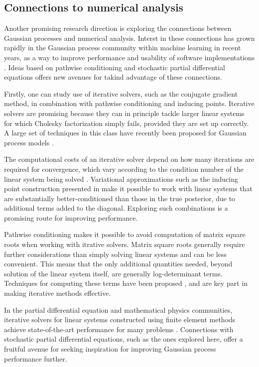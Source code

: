 \documentclass[11pt]{book}
\begin{document}
\subsection*{Connections to numerical analysis}

Another promising research direction is exploring the connections between Gaussian processes and numerical analysis.
Interst in these connections has grown rapidly in the Gaussian process community within machine learning in recent years, as a way to improve performance and usability of software implementations \cite{matthews17,gardner18,vanderwilk20}. 
Ideas based on pathwise conditioning and stochastic partial differential equations offers new avenues for takind advantage of these connections.

Firstly, one can study use of iterative solvers, such as the conjugate gradient method, in combination with pathwise conditioning and inducing points.
Iterative solvers are promising because they can in principle tackle larger linear systems for which Cholesky factorization simply fails, provided they are set up correctly.
A large set of techniques in this class have recently been proposed for Gaussian process models \cite{dong17,gardner18,pleiss18,meanti20,pleiss20}.

The computational costs of an iterative solver depend on how many iterations are required for convergence, which vary according to the condition number of the linear system being solved \cite{saad03}.
Variational approximations such as the inducing point construction presented in  make it possible to work with linear systems that are substantially better-conditioned than those in the true posterior, due to additional terms added to the diagonal.
Exploring such combinations is a promising route for improving performance.

Pathwise conditioning makes it possible to avoid computation of matrix square roots when working with itrative solvers.
Matrix square roots generally require further considerations than simply solving linear systems \cite{pleiss20} and can be less convenient.
This means that the only additional quantities needed, beyond solution of the linear system itself, are generally log-determinant terms.
Techniques for computing these terms have been proposed \cite{dong17}, and are key part in making iterative methods effective.

In the partial differential equation and mathematical physics communities, iterative solvers for linear systems constructed using finite element methods achieve state-of-the-art performance for many problems \cite{evans10,lord14}.
Connections with stochastic partial differential equations, such as the ones explored here, offer a fruitful avenue for seeking inspiration for improving Gaussian process performance further.
\end{document}
